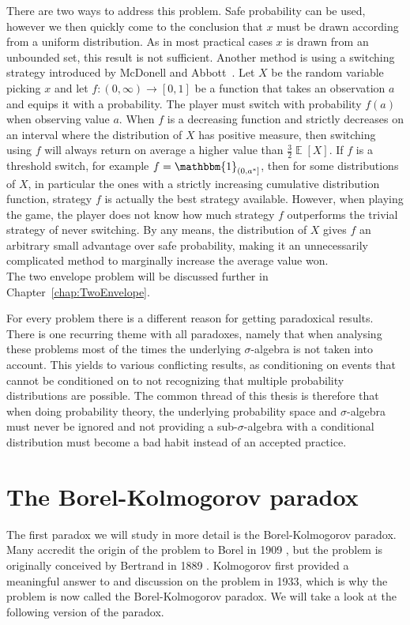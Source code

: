 \documentclass[a4paper]{report}
\theoremstyle{plain}
\theoremstyle{definition}
\theoremstyle{remark}
\numberwithin{equation}{chapter}
\DeclareMathOperator{\E}{\mathbb{E}}
\DeclareMathOperator{\1}{\mathbbm{1}}
\begin{document}
There are two ways to address this problem. Safe probability can be used, however we then quickly come to the conclusion that $x$ must be drawn according from a uniform distribution. As in most practical cases $x$ is drawn from an unbounded set, this result is not sufficient. Another method is using a switching strategy introduced by McDonell and Abbott~\cite{McDonnell09,Abbott10,McDonnell11}. Let $X$ be the random variable picking $x$ and let $f\colon (0,\infty)\to[0,1]$ be a function that takes an observation $a$ and equips it with a probability. The player must switch with probability $f(a)$ when observing value $a$. When $f$ is a decreasing function and strictly decreases on an interval where the distribution of $X$ has positive measure, then switching using $f$ will always return on average a higher value than $\frac{3}{2}\E[X]$. If $f$ is a threshold switch, for example $f=\1_{(0,a^*]}$, then for some distributions of $X$, in particular the ones with a strictly increasing cumulative distribution function, strategy $f$ is actually the best strategy available. However, when playing the game, the player does not know how much strategy $f$ outperforms the trivial strategy of never switching. By any means, the distribution of $X$ gives $f$ an arbitrary small advantage over safe probability, making it an unnecessarily complicated method to marginally increase the average value won.\\
The two envelope problem will be discussed further in Chapter~\ref{chap:TwoEnvelope}.

For every problem there is a different reason for getting paradoxical results. There is one recurring theme with all paradoxes, namely that when analysing these problems most of the times the underlying $\sigma$-algebra is not taken into account. This yields to various conflicting results, as conditioning on events that cannot be conditioned on to not recognizing that multiple probability distributions are possible. The common thread of this thesis is therefore that when doing probability theory, the underlying probability space and $\sigma$-algebra must never be ignored and not providing a sub-$\sigma$-algebra with a conditional distribution must become a bad habit instead of an accepted practice.

\chapter{The Borel-Kolmogorov paradox}\label{chap:BorelKolmogorov}
The first paradox we will study in more detail is the Borel-Kolmogorov paradox. Many accredit the origin of the problem to Borel in 1909 \cite{Borel09}, but the problem is originally conceived by Bertrand in 1889 \cite{Bertrand89}. Kolmogorov \cite{Kolmogorov33} first provided a meaningful answer to and discussion on the problem in 1933, which is why the problem is now called the Borel-Kolmogorov paradox. We will take a look at the following version of the paradox.
\end{document}
